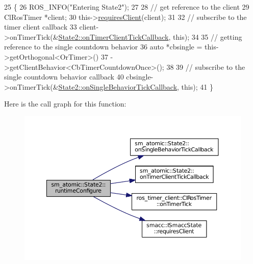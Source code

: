 \begin{DoxyCode}
25     \{
26         ROS\_INFO(\textcolor{stringliteral}{"Entering State2"});
27 
28         \textcolor{comment}{// get reference to the client}
29         ClRosTimer *client;
30         this->\hyperlink{classsmacc_1_1ISmaccState_a7f95c9f0a6ea2d6f18d1aec0519de4ac}{requiresClient}(client);
31 
32         \textcolor{comment}{// subscribe to the timer client callback}
33         client->onTimerTick(&\hyperlink{structsm__atomic_1_1State2_ab265295bfddde63b2dcf5f97bfc44e48}{State2::onTimerClientTickCallback}, \textcolor{keyword}{this});
34 
35          \textcolor{comment}{// getting reference to the single countdown behavior}
36         \textcolor{keyword}{auto} *cbsingle = this->getOrthogonal<OrTimer>()
37                              ->getClientBehavior<CbTimerCountdownOnce>();
38 
39         \textcolor{comment}{// subscribe to the single countdown behavior callback}
40         cbsingle->onTimerTick(&\hyperlink{structsm__atomic_1_1State2_a871fb6c688a61bb4902ea6d44f51025c}{State2::onSingleBehaviorTickCallback}, \textcolor{keyword}{
      this});
41     \}
\end{DoxyCode}


Here is the call graph for this function\+:
\nopagebreak
\begin{figure}[H]
\begin{center}
\leavevmode
\includegraphics[width=350pt]{structsm__atomic_1_1State2_afd749890e13d8aa36f1ac6645a5f7f9a_cgraph}
\end{center}
\end{figure}


